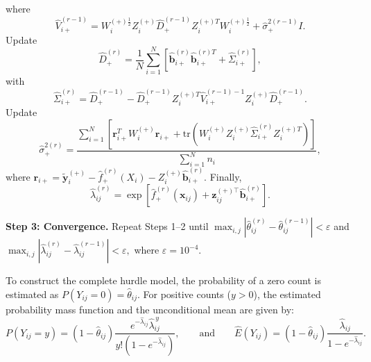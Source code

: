 \documentclass[twoside]{article}
\begin{document}
\begin{alg}
\begin{equation*}
	\end{equation*}
	where
	\begin{equation*}
		\hat V_{i+}^{(r-1)}
		=
		W_i^{(+)\frac12}
		Z_i^{(+)}
		\hat D_+^{(r-1)}
		Z_i^{(+)T}
		W_i^{(+)\frac12}
		+
		\hat\sigma_+^{2(r-1)}I .
	\end{equation*}
	Update
	\begin{equation*}
		\hat D_+^{(r)}
		=
		\frac{1}{N}
		\sum_{i=1}^{N}
		\left[
		\hat{\mathbf b}_{i+}^{(r)}
		\hat{\mathbf b}_{i+}^{(r)T}
		+
		\hat\Sigma_{i+}^{(r)}
		\right],
	\end{equation*}
	with
	\begin{equation*}
		\hat\Sigma_{i+}^{(r)}
		=
		\hat D_+^{(r-1)}
		-
		\hat D_+^{(r-1)}
		Z_i^{(+)T}
		\hat V_{i+}^{(r-1)-1}
		Z_i^{(+)}
		\hat D_+^{(r-1)} .
	\end{equation*}
	Update
	\begin{equation*}
		\hat\sigma_+^{2(r)}
		=
		\frac
		{
			\sum_{i=1}^{N}
			\left[
			\mathbf r_{i+}^{T}
			W_i^{(+)}
			\mathbf r_{i+}
			+
			\mathrm{tr}
			\!\left(
			W_i^{(+)}
			Z_i^{(+)}
			\hat\Sigma_{i+}^{(r)}
			Z_i^{(+)T}
			\right)
			\right]
		}
		{\sum_{i=1}^{N}n_i},
	\end{equation*}
	where
	$
	\mathbf r_{i+}
	=
	\tilde{\mathbf y}_i^{(+)}
	-
	\hat f_+^{(r)}(X_i)
	-
	Z_i^{(+)}
	\hat{\mathbf b}_{i+}^{(r)}
	$.
	Finally,
	\begin{equation*}
		\hat\lambda_{ij}^{(r)}
		=
		\exp
		\left[
		\hat f_+^{(r)}(\mathbf x_{ij})
		+
		\mathbf z_{ij}^{(+)\top}
		\hat{\mathbf b}_{i+}^{(r)}
		\right].
	\end{equation*}
	
	\textbf{Step 3: Convergence.}
	Repeat Steps 1--2 until
	$
		\max_{i,j}
		\left|
		\hat\theta_{ij}^{(r)}
		-
		\hat\theta_{ij}^{(r-1)}
		\right|
		<\varepsilon
	$
	and
	$
		\max_{i,j}
		\left|
		\hat\lambda_{ij}^{(r)}
		-
		\hat\lambda_{ij}^{(r-1)}
		\right|
		<\varepsilon,
	$
	where $\varepsilon=10^{-4}$.
\end{alg}
To construct the complete hurdle model, the probability of a zero count is estimated as $P(Y_{ij}=0)=\hat\theta_{ij}$. For positive counts ($y>0$), the estimated probability mass function and the unconditional mean are given by:
\begin{equation*}
	P(Y_{ij}=y)
	=
	(1-\hat\theta_{ij})
	\frac
	{e^{-\hat\lambda_{ij}}\hat\lambda_{ij}^{\,y}}
	{y!\left(1-e^{-\hat\lambda_{ij}}\right)},
	\qquad \text{and} \qquad
	\widehat E(Y_{ij})
	=
	(1-\hat\theta_{ij})
	\frac{\hat\lambda_{ij}}
	{1-e^{-\hat\lambda_{ij}}}.
\end{equation*}
\end{document}
